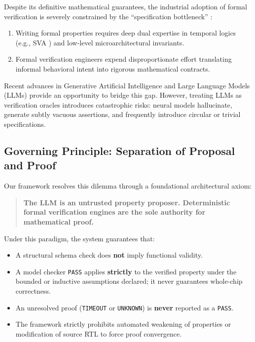 \documentclass[11pt,a4paper]{article}
\begin{document}
Despite its definitive mathematical guarantees, the industrial adoption of formal verification is severely constrained by the ``specification bottleneck'' \cite{chockler2006coverage}:
\begin{enumerate}[label=(\roman*)]
    \item Writing formal properties requires deep dual expertise in temporal logics (e.g., SVA \cite{ieee1800_2023}) and low-level microarchitectural invariants.
    \item Formal verification engineers expend disproportionate effort translating informal behavioral intent into rigorous mathematical contracts.
\end{enumerate}

Recent advances in Generative Artificial Intelligence and Large Language Models (LLMs) provide an opportunity to bridge this gap. However, treating LLMs as verification oracles introduces catastrophic risks: neural models hallucinate, generate subtly vacuous assertions, and frequently introduce circular or trivial specifications. 

\subsection{Governing Principle: Separation of Proposal and Proof}
Our framework resolves this dilemma through a foundational architectural axiom:
\begin{quote}
\textbf{The LLM is an untrusted property proposer. Deterministic formal verification engines are the sole authority for mathematical proof.}
\end{quote}
Under this paradigm, the system guarantees that:
\begin{itemize}[noitemsep]
    \item A structural schema check does \textbf{not} imply functional validity.
    \item A model checker \texttt{PASS} applies \textbf{strictly} to the verified property under the bounded or inductive assumptions declared; it never guarantees whole-chip correctness.
    \item An unresolved proof (\texttt{TIMEOUT} or \texttt{UNKNOWN}) is \textbf{never} reported as a \texttt{PASS}.
    \item The framework strictly prohibits automated weakening of properties or modification of source RTL to force proof convergence.
\end{itemize}
\end{document}
